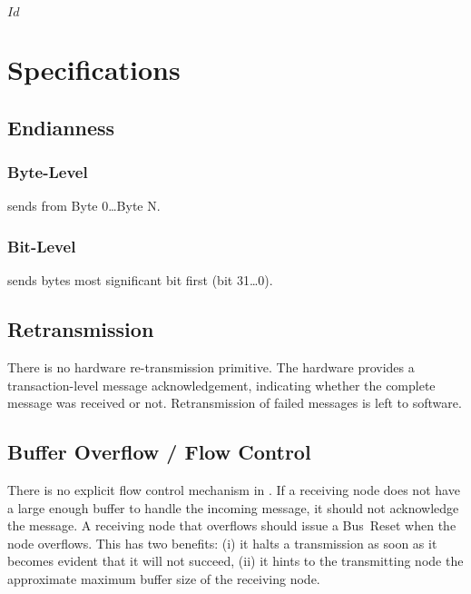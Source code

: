 \svnInfo $Id$

\section{Specifications}

\subsection{Endianness}

\subsubsection{Byte-Level}
\bus sends from Byte 0{\ldots}Byte N.

\subsubsection{Bit-Level}
\bus sends bytes most significant bit first (bit 31{\ldots}0).

\subsection{Retransmission}
There is no hardware re-transmission primitive. The hardware provides a
transaction-level message acknowledgement, indicating whether the complete
message was received or not. Retransmission of failed messages is left to
software.

\subsection{Buffer Overflow / Flow Control}
There is no explicit flow control mechanism in \bus. If a receiving node does
not have a large enough buffer to handle the incoming message, it should not
acknowledge the message. A receiving node that overflows should issue a
Bus~Reset when the node overflows. This has two benefits: (i) it halts a
transmission as soon as it becomes evident that it will not succeed, (ii) it
hints to the transmitting node the approximate maximum buffer size of the
receiving node.
